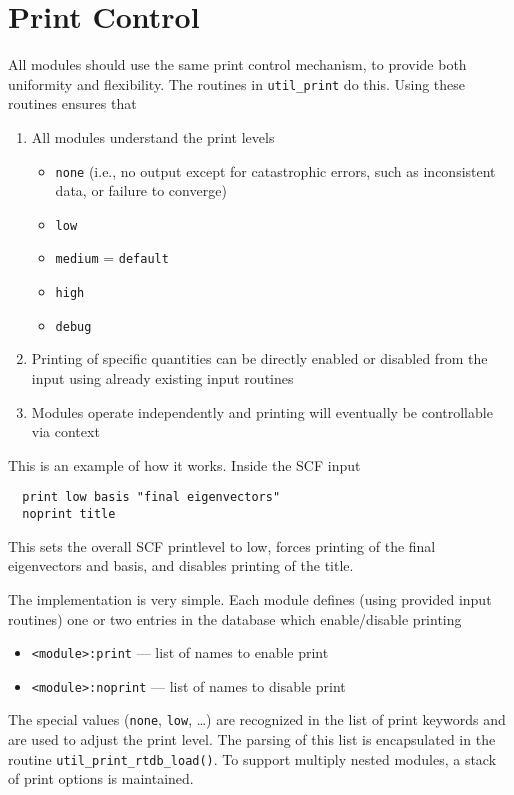 \section{Print Control}
\label{sec:print}

All modules should use the same print control mechanism, to provide
both uniformity and flexibility.  The routines in \verb+util_print+ do
this.  Using these routines ensures that

\begin{enumerate}
\item All modules understand the print levels
\begin{itemize}
\item \verb+none+ (i.e., no output except for catastrophic errors, such as 
inconsistent data, or failure to converge)
\item \verb+low+
\item \verb+medium+ = \verb+default+
\item \verb+high+
\item \verb+debug+
\end{itemize}
\item Printing of specific quantities can be directly enabled or
  disabled from the input using already existing input routines
\item Modules operate independently and printing will eventually be
   controllable via context
\end{enumerate}

This is an example of how it works. Inside the SCF input
\begin{verbatim}
  print low basis "final eigenvectors"
  noprint title
\end{verbatim}
This sets the overall SCF printlevel to low, forces printing of the
final eigenvectors and basis, and disables printing of the title.

The implementation is very simple.  Each module defines (using
provided input routines) one or two entries in the database which
enable/disable printing

\begin{itemize}
\item \verb+<module>:print+ --- list of names to enable print
\item \verb+<module>:noprint+ --- list of names to disable print
\end{itemize}

The special values ({\tt none}, {\tt low}, \ldots) are recognized in
the list of print keywords and are used to adjust the print level.
The parsing of this list is encapsulated in the routine
\verb+util_print_rtdb_load()+.  To support multiply nested modules, a
stack of print options is maintained.

